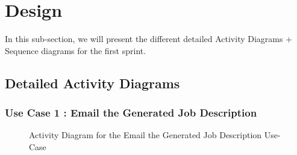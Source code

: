 \section{Design}
In this sub-section, we will present the different detailed Activity Diagrams + Sequence diagrams for the first sprint.

\newpage
\subsection{Detailed Activity Diagrams}
\subsubsection{Use Case 1 : Email the Generated Job Description}


\begin{figure}[H]
    \centering
    \caption{ Activity Diagram for the Email the Generated Job Description Use-Case }
    \label{fig:UseCase1Sprint3_Activity_Diagram}
\end{figure}

